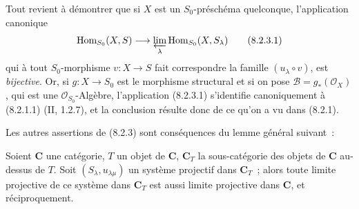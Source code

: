 Tout revient à démontrer que si $X$ est un $S_0$-préschéma quelconque,
l'application canonique
\begin{equation}
\operatorname{Hom}_{S_0}(X,S)\longrightarrow
\varprojlim_\lambda\operatorname{Hom}_{S_0}(X,S_\lambda)
\tag{8.2.3.1}\label{IV.8.2.3.1-fr}
\end{equation}
qui à tout $S_0$-morphisme $v:X\to S$ fait correspondre la famille
$(u_\lambda\circ v)$, est \emph{bijective}. Or, si $g:X\to S_0$ est le
morphisme structural et si on pose $\mathscr B=g_*(\mathcal O_X)$, qui est
une $\mathcal O_{S_0}$-Algèbre, l'application (8.2.3.1) s'identifie
canoniquement à (8.2.1.1) (II, 1.2.7), et la conclusion résulte donc de ce
qu'on a vu dans (8.2.1).

Les autres assertions de (8.2.3) sont conséquences du lemme général suivant~:

\begin{lemma}[8.2.4]
\label{IV.8.2.4-fr}
Soient $\mathbf C$ une catégorie, $T$ un objet de $\mathbf C$,
$\mathbf C_T$ la sous-catégorie des objets de $\mathbf C$ au-dessus de $T$.
Soit $(S_\lambda,u_{\lambda\mu})$ un système projectif dans $\mathbf C_T$~;
alors toute limite projective de ce système dans $\mathbf C_T$ est aussi
limite projective dans $\mathbf C$, et réciproquement.
\end{lemma}

